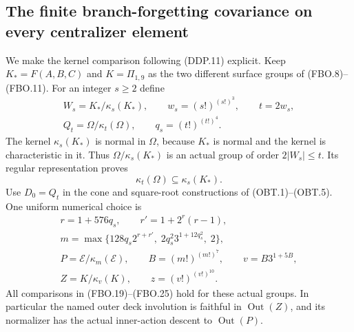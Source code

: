 \subsection{The finite branch-forgetting covariance on every centralizer element}

We make the kernel comparison following (DDP.11) explicit.
Keep $K_*=F(A,B,C)$ and $K=\Pi_{1,9}$ as the two different
surface groups of (FBO.8)--(FBO.11).
For an integer $s\geq2$ define
\[
 \begin{gathered}
 W_s=K_*/\kappa_s(K_*),\qquad
 w_s=(s!)^{(s!)^3},\qquad t=2w_s,\\
 Q_t=\Omega/\kappa_t(\Omega),\qquad
 q_s=(t!)^{(t!)^4}.
 \end{gathered}                                                   \tag{BCV.1}
\]
The kernel $\kappa_s(K_*)$ is normal in $\Omega$, because
$K_*$ is normal and the kernel is characteristic in it.
Thus $\Omega/\kappa_s(K_*)$ is an actual group of order
$2|W_s|\leq t$.  Its regular representation proves
\[
                    \kappa_t(\Omega)\subseteq\kappa_s(K_*).
                                                               \tag{BCV.2}
\]
Use $D_0=Q_t$ in the cone and square-root constructions of
(OBT.1)--(OBT.5).  One uniform numerical choice is
\[
 \begin{gathered}
 r=1+576q_s,\qquad r'=1+2^r(r-1),\\
 m=\max\{128q_s2^{r+r'},\;2q_s^2 3^{1+12q_s^2},\;2\},\\
 P=\mathcal E/\kappa_m(\mathcal E),\qquad
 B=(m!)^{(m!)^7},\qquad v=B3^{1+5B},\\
 Z=K/\kappa_v(K),\qquad z=(v!)^{(v!)^{10}}.
 \end{gathered}                                                   \tag{BCV.3}
\]
All comparisons in (FBO.19)--(FBO.25) hold for these actual
groups.  In particular the named outer deck involution is
faithful in $\operatorname{Out}(Z)$, and its normalizer
has the actual inner-action descent to
$\operatorname{Out}(P)$.

